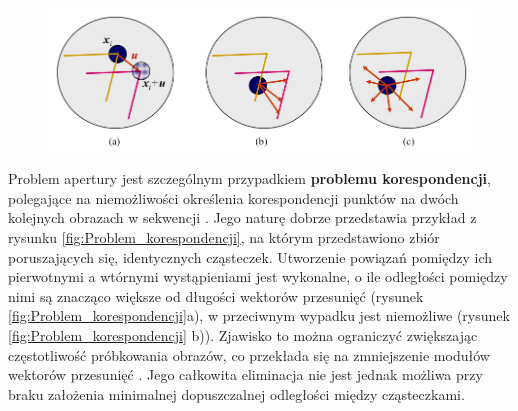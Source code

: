 \begin{figure}[!htb]
	\begin{center}
		\includegraphics[width=12cm]{images/aperture_problem.png}
	\end{center}	
\label{fig:Problem_apertury}
\end{figure}

Problem apertury jest szczególnym przypadkiem \textbf{problemu korespondencji}, polegające na niemożliwości określenia korespondencji punktów na dwóch kolejnych obrazach w sekwencji \cite{Jaehne2005}. Jego naturę dobrze przedstawia przykład z rysunku \ref{fig:Problem_korespondencji}, na którym przedstawiono zbiór poruszających się, identycznych cząsteczek. Utworzenie powiązań pomiędzy ich pierwotnymi a wtórnymi wystąpieniami jest wykonalne, o ile odległości pomiędzy nimi są znacząco większe od długości wektorów przesunięć (rysunek \ref{fig:Problem_korespondencji}a), w przeciwnym wypadku jest niemożliwe (rysunek \ref{fig:Problem_korespondencji} b)). Zjawisko to można ograniczyć zwiększając częstotliwość próbkowania obrazów, co przekłada się na zmniejszenie modułów wektorów przesunięć \cite{Jaehne2005}. Jego całkowita eliminacja nie jest jednak możliwa przy braku założenia minimalnej dopuszczalnej odległości między cząsteczkami.

